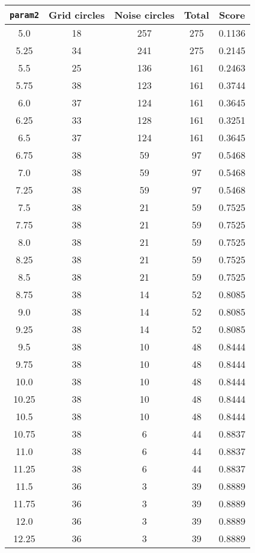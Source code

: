 \documentclass[letterpaper, 12pt]{article}
\begin{document}
\begin{longtable}{|c|c|c|c|c|}
\hline
\textbf{\texttt{param2}} & \textbf{Grid circles} & \textbf{Noise circles} & \textbf{Total} & \textbf{Score} \\
\hline
5.0 & 18 & 257 & 275 & 0.1136 \\
\hline
5.25 & 34 & 241 & 275 & 0.2145 \\
\hline
5.5 & 25 & 136 & 161 & 0.2463 \\
\hline
5.75 & 38 & 123 & 161 & 0.3744 \\
\hline
6.0 & 37 & 124 & 161 & 0.3645 \\
\hline
6.25 & 33 & 128 & 161 & 0.3251 \\
\hline
6.5 & 37 & 124 & 161 & 0.3645 \\
\hline
6.75 & 38 & 59 & 97 & 0.5468 \\
\hline
7.0 & 38 & 59 & 97 & 0.5468 \\
\hline
7.25 & 38 & 59 & 97 & 0.5468 \\
\hline
7.5 & 38 & 21 & 59 & 0.7525 \\
\hline
7.75 & 38 & 21 & 59 & 0.7525 \\
\hline
8.0 & 38 & 21 & 59 & 0.7525 \\
\hline
8.25 & 38 & 21 & 59 & 0.7525 \\
\hline
8.5 & 38 & 21 & 59 & 0.7525 \\
\hline
8.75 & 38 & 14 & 52 & 0.8085 \\
\hline
9.0 & 38 & 14 & 52 & 0.8085 \\
\hline
9.25 & 38 & 14 & 52 & 0.8085 \\
\hline
9.5 & 38 & 10 & 48 & 0.8444 \\
\hline
9.75 & 38 & 10 & 48 & 0.8444 \\
\hline
10.0 & 38 & 10 & 48 & 0.8444 \\
\hline
10.25 & 38 & 10 & 48 & 0.8444 \\
\hline
10.5 & 38 & 10 & 48 & 0.8444 \\
\hline
10.75 & 38 & 6 & 44 & 0.8837 \\
\hline
11.0 & 38 & 6 & 44 & 0.8837 \\
\hline
11.25 & 38 & 6 & 44 & 0.8837 \\
\hline
11.5 & 36 & 3 & 39 & 0.8889 \\
\hline
11.75 & 36 & 3 & 39 & 0.8889 \\
\hline
12.0 & 36 & 3 & 39 & 0.8889 \\
\hline
12.25 & 36 & 3 & 39 & 0.8889 \\

\end{longtable}
\end{document}
